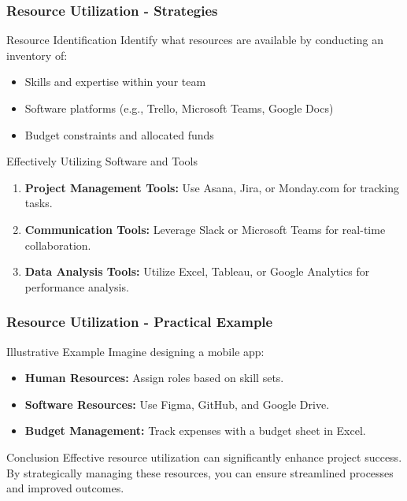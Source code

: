 \documentclass[aspectratio=169]{beamer}
\begin{document}
\begin{frame}[fragile]
    \frametitle{Resource Utilization - Strategies}
    \begin{block}{Resource Identification}
        Identify what resources are available by conducting an inventory of:
        \begin{itemize}
            \item Skills and expertise within your team
            \item Software platforms (e.g., Trello, Microsoft Teams, Google Docs)
            \item Budget constraints and allocated funds
        \end{itemize}
    \end{block}
    
    \begin{block}{Effectively Utilizing Software and Tools}
        \begin{enumerate}
            \item \textbf{Project Management Tools:} Use Asana, Jira, or Monday.com for tracking tasks.
            \item \textbf{Communication Tools:} Leverage Slack or Microsoft Teams for real-time collaboration.
            \item \textbf{Data Analysis Tools:} Utilize Excel, Tableau, or Google Analytics for performance analysis.
        \end{enumerate}
    \end{block}
\end{frame}

\begin{frame}[fragile]
    \frametitle{Resource Utilization - Practical Example}
    \begin{block}{Illustrative Example}
        Imagine designing a mobile app:
        \begin{itemize}
            \item \textbf{Human Resources:} Assign roles based on skill sets.
            \item \textbf{Software Resources:} Use Figma, GitHub, and Google Drive.
            \item \textbf{Budget Management:} Track expenses with a budget sheet in Excel.
        \end{itemize}
    \end{block}
    
    \begin{block}{Conclusion}
        Effective resource utilization can significantly enhance project success. By strategically managing these resources, you can ensure streamlined processes and improved outcomes.
    \end{block}
\end{frame}
\end{document}
